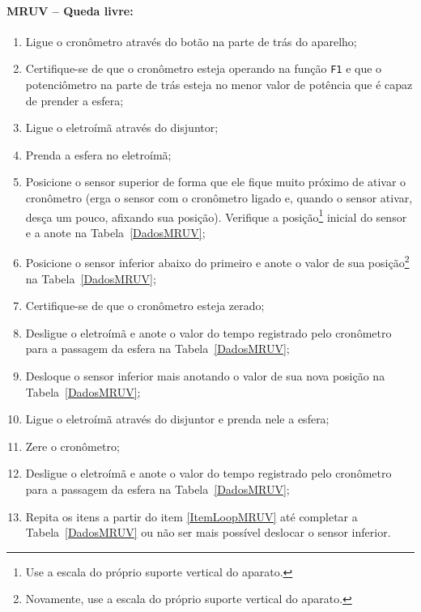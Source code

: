 \paragraph{MRUV -- Queda livre:}

\begin{enumerate}
    \item Ligue o cronômetro através do botão na parte de trás do aparelho;
    \item Certifique-se de que o cronômetro esteja operando na função \texttt{F1} e que o potenciômetro na parte de trás esteja no menor valor de potência que é capaz de prender a esfera;
    \item Ligue o eletroímã através do disjuntor;
	\item Prenda a esfera no eletroímã;
	\item Posicione o sensor superior de forma que ele fique muito próximo de ativar o cronômetro (erga o sensor com o cronômetro ligado e, quando o sensor ativar, desça um pouco, afixando sua posição). Verifique a posição\footnote{Use a escala do próprio suporte vertical do aparato.} inicial do sensor e a anote na Tabela~\ref{DadosMRUV};
	\item Posicione o sensor inferior  abaixo do primeiro e anote o valor de sua posição\footnote{Novamente, use a escala do próprio suporte vertical do aparato.} na Tabela~\ref{DadosMRUV};
	\item Certifique-se de que o cronômetro esteja zerado;
	\item Desligue o eletroímã e anote o valor do tempo registrado pelo cronômetro para a passagem da esfera na Tabela~\ref{DadosMRUV};
	\item Desloque o sensor inferior mais  anotando o valor de sua nova posição na Tabela~\ref{DadosMRUV};\label{ItemLoopMRUV}
	\item Ligue o eletroímã através do disjuntor e prenda nele a esfera;
	\item Zere o cronômetro;
	\item Desligue o eletroímã e anote o valor do tempo registrado pelo cronômetro para a passagem da esfera na Tabela~\ref{DadosMRUV};
	\item Repita os itens a partir do item \ref{ItemLoopMRUV} até completar a Tabela~\ref{DadosMRUV} ou não ser mais possível deslocar o sensor inferior.
\end{enumerate}

\cleardoublepage

